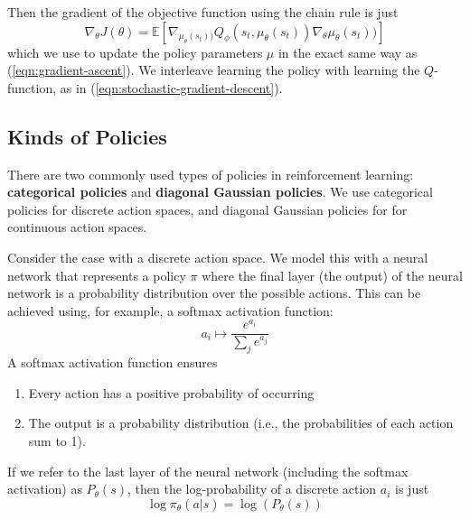 \documentclass[journal, onecolumn, 12pt, draftclsnofoot]{IEEEtran}
\newcommand{\kword}[1]{\textbf{#1}}
\begin{document}
		Then the gradient of the objective function using the chain rule is just
		\begin{equation}
			\label{eqn:dqn-gradient}
			\nabla_\theta J(\theta) = \mathbb{E}\left[ \nabla_{\mu_\theta(s_t))} Q_\phi(s_t, \mu_\theta(s_t)) \nabla_\theta \mu_\theta(s_t)) \right]
		\end{equation}
		which we use to update the policy parameters $\mu$ in the exact same way as (\ref{eqn:gradient-ascent}). We interleave learning the policy with learning the $Q$-function, as in (\ref{eqn:stochastic-gradient-descent}).
		\subsection{Kinds of Policies}
		\par There are two commonly used types of policies in reinforcement learning: \kword{categorical policies} and \kword{diagonal Gaussian policies}. We use categorical policies for discrete action spaces, and diagonal Gaussian policies for for continuous action spaces.
		\par Consider the case with a discrete action space. We model this with a neural network that represents a policy $\pi$ where the final layer (the output) of the neural network is a probability distribution over the possible actions. This can be achieved using, for example, a softmax activation function:
		\begin{equation}
			\label{eqn:softmax}
			a_i \mapsto \frac{e^{a_i}}{\sum_j e^{a_j}}
		\end{equation}
		A softmax activation function ensures
		\begin{enumerate}
			\item Every action has a positive probability of occurring
			\item The output is a probability distribution (i.e., the probabilities of each action sum to 1).
		\end{enumerate}
		If we refer to the last layer of the neural network (including the softmax activation) as $P_\theta(s)$, then the log-probability of a discrete action $a_i$ is just
		\begin{equation}
			\label{eqn:log-prob-discrete}
			\log \pi_\theta (a \big\vert s) = \log \left( P_\theta(s) \right)
		\end{equation}
\end{document}
